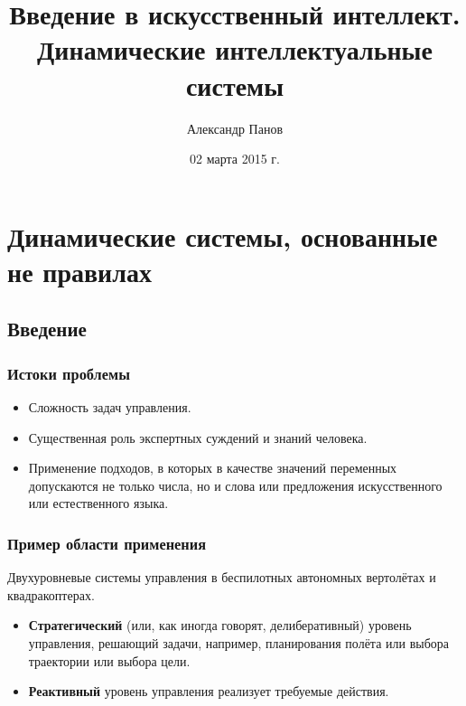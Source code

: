 \documentclass[default]{beamer}
\begin{document}
	
	\title[Введение в ИИ. ДИС]{Введение в искусственный интеллект.\\Динамические интеллектуальные системы}
	\author[Панов]{Александр Панов}
	\date{02 марта 2015 г.} 
	
	\begin{frame}
		\titlepage
	\end{frame}
	
	\section {Динамические системы, основанные не правилах}
	\subsection{Введение}
	\begin{frame}
		\frametitle{Истоки проблемы}
		\begin{itemize}
			\item Сложность задач управления.
			\item Существенная роль экспертных суждений и знаний человека.
			\item Применение подходов, в которых в качестве значений переменных допускаются не только числа, но и слова или предложения искусственного или естественного языка.
		\end{itemize}
	\end{frame}

	\begin{frame}
		\frametitle{Пример области применения}
		
		Двухуровневые системы управления в беспилотных автономных вертолётах и квадракоптерах.
		\begin{itemize}
			\item \textbf{Стратегический} (или, как иногда говорят, делиберативный) уровень управления, решающий задачи, например, планирования полёта или выбора траектории или выбора цели.
			\item \textbf{Реактивный} уровень управления реализует требуемые действия. 
		\end{itemize}
	\end{frame}
\end{document}
